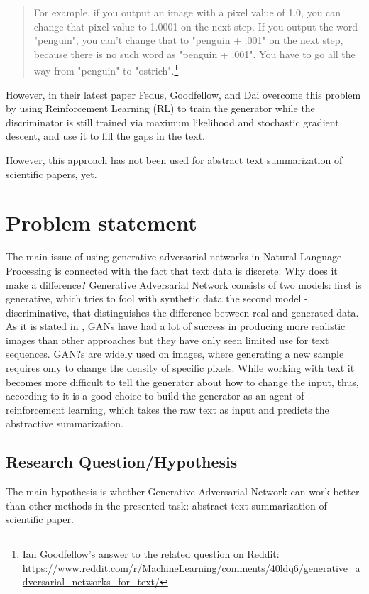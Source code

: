 \documentclass[sigplan]{acmart}
\begin{document}
\begin{quote}
For example, if you output an image with a pixel value of 1.0, you can change that pixel value to 1.0001 on the next step. If you output the word "penguin", you can't change that to "penguin + .001" on the next step, because there is no such word as "penguin + .001". You have to go all the way from "penguin" to "ostrich".\footnote{Ian Goodfellow's answer to the related question on Reddit: \url{https://www.reddit.com/r/MachineLearning/comments/40ldq6/generative_adversarial_networks_for_text/}}
\end{quote}

However, in their latest paper Fedus, Goodfellow, and Dai\cite{fedus-18} overcome this problem by using Reinforcement Learning (RL) to train the generator while the discriminator is still trained via maximum likelihood and stochastic gradient descent, and use it to fill the gaps in the text.
 
However, this approach has not been used for abstract text summarization of scientific papers, yet.

\section{Problem statement}

The main issue of using generative adversarial networks in Natural Language Processing is connected with the fact that text data is discrete. Why does it make a difference?
Generative Adversarial Network consists of two models: first is generative, which tries to fool with synthetic data the second model - discriminative, that distinguishes the difference between real and generated data. As it is stated in \cite{fedus-18}, GANs have had a lot of success in producing more realistic images than other approaches but they have only seen limited use for text sequences. 
GAN?s are widely used on images, where generating a new sample requires only to change the density of specific pixels. While working with text it becomes more difficult to tell the generator about how to change the input, thus, according to \cite{liu-17} it is a good choice to build the generator as an agent of reinforcement learning, which takes the raw text as input and predicts the abstractive summarization.

\subsection{Research Question/Hypothesis}
The main hypothesis is whether Generative Adversarial Network can work better than other methods in the presented task: abstract text summarization of scientific paper. 
\end{document}
